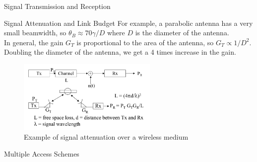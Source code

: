 \begin{section}{Signal Transmission and Reception}
\begin{subsection}{Signal Attenuation and Link Budget}
    For example, a parabolic antenna has a very small beamwidth, so $\theta_B \approx 70\gamma/D$
    where $D$ is the diameter of the antenna.\\
    In general, the gain $G_T$ is proportional to the area of the antenna, so $G_T\propto 1/D^2$.
    Doubling the diameter of the antenna, we get a 4 times increase in the gain.\\

    \begin{figure}[h]
      \centering
      \includegraphics[width=0.6\textwidth]{img/wireless/signal attenuation.png}
      \caption{Example of signal attenuation over a wireless medium}
      \label{fig:antenna gain}
    \end{figure}
  \end{subsection}
  \begin{subsection}{Multiple Access Schemes}
    \end{subsection}
\end{section}
